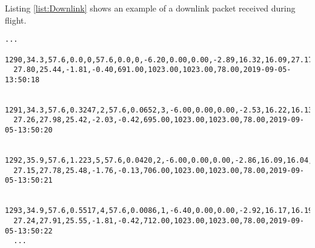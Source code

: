 Listing \ref{list:Downlink} shows an example of a downlink packet received during flight.
\begin{lstlisting}[caption = Sample of downlinked data packets., label={list:Downlink}]
  ...
  1290,34.3,57.6,0.0,0,57.6,0.0,0,-6.20,0.00,0.00,-2.89,16.32,16.09,27.17,
  27.80,25.44,-1.81,-0.40,691.00,1023.00,1023.00,78.00,2019-09-05-13:50:18
  
  1291,34.3,57.6,0.3247,2,57.6,0.0652,3,-6.00,0.00,0.00,-2.53,16.22,16.13,
  27.26,27.98,25.42,-2.03,-0.42,695.00,1023.00,1023.00,78.00,2019-09-05-13:50:20
  
  1292,35.9,57.6,1.223,5,57.6,0.0420,2,-6.00,0.00,0.00,-2.86,16.09,16.04,
  27.15,27.78,25.48,-1.76,-0.13,706.00,1023.00,1023.00,78.00,2019-09-05-13:50:21
  
  1293,34.9,57.6,0.5517,4,57.6,0.0086,1,-6.40,0.00,0.00,-2.92,16.17,16.19,
  27.24,27.91,25.55,-1.81,-0.42,712.00,1023.00,1023.00,78.00,2019-09-05-13:50:22
  ...
\end{lstlisting}
